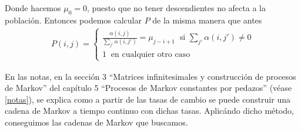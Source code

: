 Donde hacemos $\mu_0 = 0$, puesto que no tener descendientes no afecta a la población. Entonces podemos calcular $P$ de la misma manera que antes
\begin{align}
        P(i,j)  = 
            \begin{cases}
                \frac{\alpha(i,j)}{\sum_{j'}\alpha(i, j')} = \mu_{j-i+1}  \;\; \text{si $\sum_{j'}\alpha(i, j') \not= 0$} \\
                1                                                         \;\; \text{en cualquier otro caso}
            \end{cases}
\end{align}

En las notas, en la sección 3 ``Matrices infinitesimales y construcción de procesos de Markov'' del capítulo 5 
``Procesos de Markov constantes por pedazos'' (véase \ref{notas}), se explica como a partir de las tasas de cambio se puede
construir una cadena de Markov a tiempo continuo con dichas tasas. Aplicándo dicho método, conseguimos las cadenas de Markov que buscamos.
